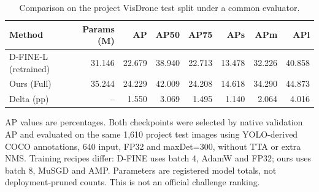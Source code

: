 \begin{table}[t]
\centering
\small
\setlength{\tabcolsep}{4pt}
\caption{Comparison on the project VisDrone test split under a common evaluator.}
\label{tab:selected-1}
\begin{tabular}{lrrrrrrr}
\toprule
Method & Params (M) & AP & AP50 & AP75 & APs & APm & APl \\
\midrule
D-FINE-L (retrained) & 31.146 & 22.679 & 38.940 & 22.713 & 13.478 & 32.226 & 40.858 \\
Ours (Full) & 35.244 & 24.229 & 42.009 & 24.208 & 14.618 & 34.290 & 44.873 \\
Delta (pp) & -- & 1.550 & 3.069 & 1.495 & 1.140 & 2.064 & 4.016 \\
\bottomrule
\end{tabular}
\par\smallskip
\begin{minipage}{0.97\textwidth}\footnotesize AP values are percentages. Both checkpoints were selected by native validation AP and evaluated on the same 1,610 project test images using YOLO-derived COCO annotations, 640 input, FP32 and maxDet=300, without TTA or extra NMS. Training recipes differ: D-FINE uses batch 4, AdamW and FP32; ours uses batch 8, MuSGD and AMP. Parameters are registered model totals, not deployment-pruned counts. This is not an official challenge ranking.\end{minipage}
\par\medskip
\end{table}
